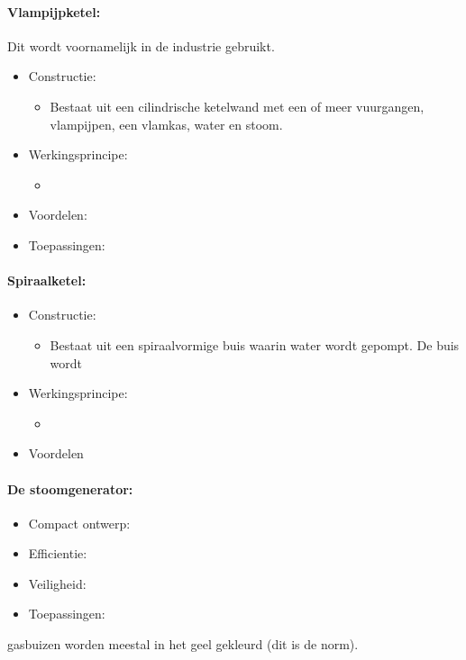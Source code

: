 \documentclass[12pt]{article}
\begin{document}
\paragraph{Vlampijpketel:}
Dit wordt voornamelijk in de industrie gebruikt.
\begin{itemize}
    \item Constructie: \begin{itemize}
        \item Bestaat uit een cilindrische ketelwand met een of meer vuurgangen, vlampijpen, een vlamkas, water en stoom.
    \end{itemize}
    \item Werkingsprincipe:\begin{itemize}
        \item 
    \end{itemize}
    \item Voordelen:
    \item Toepassingen:
\end{itemize}
\paragraph{Spiraalketel:}
\begin{itemize}
    \item Constructie: \begin{itemize}
        \item Bestaat uit een spiraalvormige buis waarin water wordt gepompt. De buis wordt
    \end{itemize}
    \item Werkingsprincipe:\begin{itemize}
        \item 
    \end{itemize}
    \item Voordelen
\end{itemize}
\paragraph{De stoomgenerator:}
\begin{itemize}
    \item Compact ontwerp:
    \item Efficientie:
    \item Veiligheid:
    \item Toepassingen:
\end{itemize}
gasbuizen worden meestal in het geel gekleurd (dit is de norm).
\end{document}
